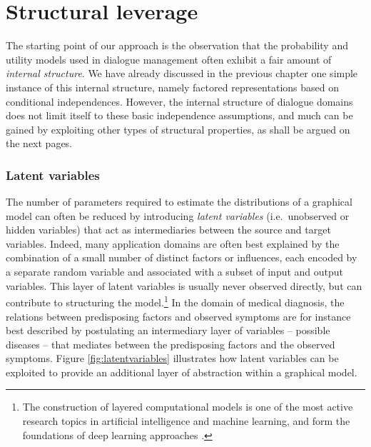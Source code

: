 \section{Structural leverage}
\label{sec:rmotivation}

The starting point of our approach is the observation that the probability and utility models used in dialogue management often exhibit a fair amount of \textit{internal structure}.  
We have already discussed in the previous chapter one simple instance of this internal structure, namely factored representations based on conditional independences. However, the internal structure of dialogue domains does not limit itself to these basic independence assumptions, and much can be gained by exploiting other types of structural properties, as shall be argued on the next pages. 



\subsubsection*{Latent variables}
 
The number of parameters required to estimate the distributions of a graphical model can often be reduced by introducing \textit{latent variables} (i.e.\ unobserved or hidden variables) that act as intermediaries between the source and target variables. Indeed, many application domains are often best explained by the combination of a small number of distinct factors or influences, each encoded by a separate random variable and associated with a subset of input and output variables. This layer of latent variables is usually never observed directly, but can contribute to structuring the model.\footnote{The construction of layered computational models is one of the most active research topics in artificial intelligence and machine learning, and form the foundations of deep learning approaches \citep{Bengio:2009}.} In the domain of medical diagnosis, the relations between predisposing factors and observed symptoms are for instance best described by postulating an intermediary layer of variables -- possible diseases -- that mediates between the predisposing factors and the observed symptoms.  Figure \ref{fig:latentvariables} illustrates how latent variables can be exploited to provide an additional layer of abstraction within a graphical model.

